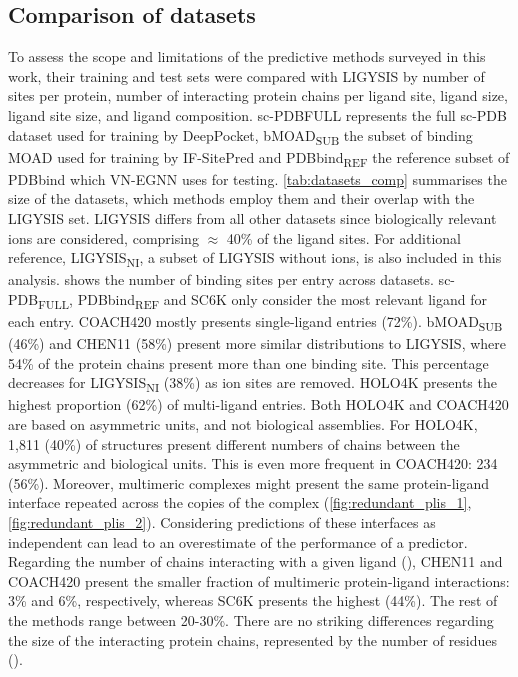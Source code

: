\subsection{Comparison of datasets}

To assess the scope and limitations of the predictive methods surveyed in this work, their training and test sets were compared with LIGYSIS by number of sites per protein, number of interacting protein chains per ligand site, ligand size, ligand site size, and ligand composition. sc-PDBFULL represents the full sc-PDB dataset used for training by DeepPocket, bMOAD\textsubscript{SUB} the subset of binding MOAD used for training by IF-SitePred and PDBbind\textsubscript{REF} the reference subset of PDBbind which VN-EGNN uses for testing. \autoref{tab:datasets_comp} summarises the size of the datasets, which methods employ them and their overlap with the LIGYSIS set. LIGYSIS differs from all other datasets since biologically relevant ions are considered, comprising $\approx$ 40\% of the ligand sites. For additional reference, LIGYSIS\textsubscript{NI}, a subset of LIGYSIS without ions, is also included in this analysis.  shows the number of binding sites per entry across datasets. sc-PDB\textsubscript{FULL}, PDBbind\textsubscript{REF} and SC6K only consider the most relevant ligand for each entry. COACH420 mostly presents single-ligand entries (72\%). bMOAD\textsubscript{SUB} (46\%) and CHEN11 (58\%) present more similar distributions to LIGYSIS, where 54\% of the protein chains present more than one binding site. This percentage decreases for LIGYSIS\textsubscript{NI} (38\%) as ion sites are removed. HOLO4K presents the highest proportion (62\%) of multi-ligand entries. Both HOLO4K and COACH420 are based on asymmetric units, and not biological assemblies. For HOLO4K, 1,811 (40\%) of structures present different numbers of chains between the asymmetric and biological units. This is even more frequent in COACH420: 234 (56\%). Moreover, multimeric complexes might present the same protein-ligand interface repeated across the copies of the complex (\autoref{fig:redundant_plis_1}, \autoref{fig:redundant_plis_2}). Considering predictions of these interfaces as independent can lead to an overestimate of the performance of a predictor. Regarding the number of chains interacting with a given ligand (), CHEN11 and COACH420 present the smaller fraction of multimeric protein-ligand interactions: 3\% and 6\%, respectively, whereas SC6K presents the highest (44\%). The rest of the methods range between 20-30\%. There are no striking differences regarding the size of the interacting protein chains, represented by the number of residues ().

